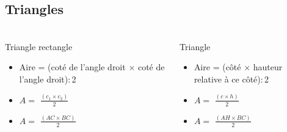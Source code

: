\documentclass[xcolor=table]{beamer}
\begin{document}
\subsection{Triangles}

\begin{frame}
	\frametitle{}  
	\framesubtitle{}	
	
	
	\begin{columns}[onlytextwidth]
		\begin{column}{0.48\textwidth}
			\begin{alertblock}{Triangle rectangle} %
				\begin{itemize}
					\item Aire = (coté de l'angle droit $\times$ coté de l'angle droit)$:$2 
					\item $A =$ {\LARGE $\frac{(c_1 \times c_2)}{2}$} 
					\item $A =$ {\LARGE $\frac{(AC \times BC)}{2}$} 
				\end{itemize}
				
			\end{alertblock}
		\end{column}
		\begin{column}{0.48\textwidth}
			\begin{alertblock}{Triangle} %
				\begin{itemize}
					\item Aire = (côté $\times$ hauteur relative à ce côté)$:$2
					\item $A =$ {\LARGE $\frac{(c \times h)}{2}$} 
					\item $A =$ {\LARGE $\frac{(AH \times BC)}{2}$} 
				\end{itemize}
				
			\end{alertblock}
		\end{column}
	\end{columns}
\end{frame}
\end{document}

